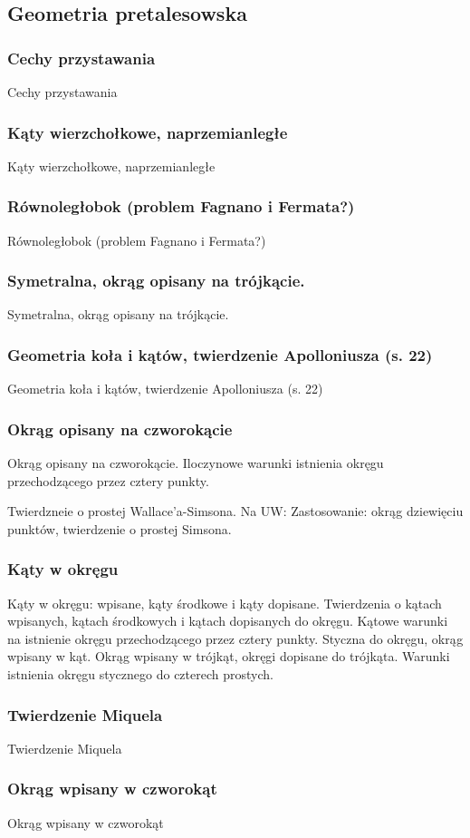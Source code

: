 \subsection{Geometria pretalesowska}
\subsubsection{Cechy przystawania}
Cechy przystawania

\subsubsection{Kąty wierzchołkowe, naprzemianległe}
Kąty wierzchołkowe, naprzemianległe



\subsubsection{Równoległobok (problem Fagnano i Fermata?)}
Równoległobok (problem Fagnano i Fermata?)

\subsubsection{Symetralna, okrąg opisany na trójkącie.}
Symetralna, okrąg opisany na trójkącie.

\subsubsection{Geometria koła i kątów, twierdzenie Apolloniusza (s. 22)}
Geometria koła i kątów, twierdzenie Apolloniusza (s. 22)

\subsubsection{Okrąg opisany na czworokącie}
Okrąg opisany na czworokącie.
Iloczynowe warunki istnienia okręgu przechodzącego przez cztery punkty.

Twierdzneie o prostej Wallace'a-Simsona.
Na UW: Zastosowanie: okrąg dziewięciu punktów, twierdzenie o prostej Simsona.

\subsubsection{Kąty w okręgu}
Kąty w okręgu: wpisane, kąty środkowe i kąty dopisane.
Twierdzenia o kątach wpisanych, kątach środkowych i kątach dopisanych do okręgu.
Kątowe warunki na istnienie okręgu przechodzącego przez cztery punkty.
Styczna do okręgu, okrąg wpisany w kąt.
Okrąg wpisany w trójkąt, okręgi dopisane do trójkąta.
Warunki istnienia okręgu stycznego do czterech prostych.

\subsubsection{Twierdzenie Miquela}
Twierdzenie Miquela

\subsubsection{Okrąg wpisany w czworokąt}
Okrąg wpisany w czworokąt

